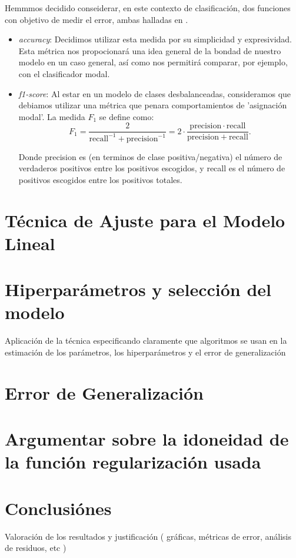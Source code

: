\documentclass[11pt,a4paper]{article}
\begin{document}
Hemmmos decidido conseiderar, en este contexto de clasificación, dos funciones con objetivo de medir el error, ambas halladas en \cite{met}.
\begin{itemize}
	\item \emph{accuracy}: Decidimos utilizar esta medida por su simplicidad y expresividad. Esta métrica nos propocionará una idea general de la bondad de nuestro modelo en un caso general, así como nos permitirá comparar, por ejemplo, con el clasificador modal. 
	\item \emph{f1-score}: Al estar en un modelo de clases desbalanceadas, consideramos que debiamos utilizar una métrica que penara comportamientos de 'asignación modal'. La medida $F_1$ se define como\cite{f1}:
	$${\displaystyle F_{1}={\frac {2}{\mathrm {recall} ^{-1}+\mathrm {precision} ^{-1}}}=2\cdot {\frac {\mathrm {precision} \cdot \mathrm {recall} }{\mathrm {precision} +\mathrm {recall} }}}.$$
	
	Donde precision es (en terminos de clase positiva/negativa) el número de verdaderos positivos entre los positivos escogidos, y recall es el número de positivos escogidos entre los positivos totales.
\end{itemize}
\section{ Técnica de Ajuste para el Modelo Lineal}




\section{Hiperparámetros y selección del modelo}
 Aplicación de la técnica especificando claramente que algoritmos se usan en la estimación de los parámetros, los hiperparámetros y el error de generalización

\section{ Error de Generalización}
\section{ Argumentar sobre la idoneidad de la función regularización usada }
\section{ Conclusiónes }
Valoración de los resultados y justificación
( gráficas, métricas de error, análisis de residuos, etc )
\end{document}
